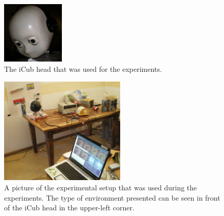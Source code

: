 \documentclass[conference]{IEEEtran}
\begin{document}
\begin{figure} [!t]
\centering
\includegraphics[width=3.0cm]{icub_head.jpg}
\caption{The iCub head that was used for the experiments.}
\label{fig:icub_head}
\end{figure}


\begin{figure} [!t]
\centering
\includegraphics[width=6.0cm]{icub_setup.jpg}
\caption{A picture of the experimental setup that was used during the
  experiments. The type of environment presented can be seen in front
  of the iCub head in the upper-left corner.}
\label{fig:icub_setup}
\end{figure}

\end{document}
